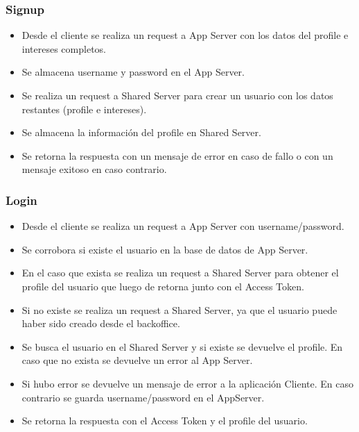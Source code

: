 \documentclass[letterpaper,10pt,english]{sphinxmanual}
\begin{document}
\subsubsection{Signup}
\label{manuals:signup}\begin{itemize}
\item {} 
Desde el cliente se realiza un request a App Server con los datos del profile e intereses completos.

\item {} 
Se almacena username y password en el App Server.

\item {} 
Se realiza un request a Shared Server para crear un usuario con los datos restantes (profile e intereses).

\item {} 
Se almacena la información del profile en Shared Server.

\item {} 
Se retorna la respuesta con un mensaje de error en caso de fallo o con un mensaje exitoso en caso contrario.

\end{itemize}


\subsubsection{Login}
\label{manuals:login}\begin{itemize}
\item {} 
Desde el cliente se realiza un request a App Server con username/password.

\item {} 
Se corrobora si existe el usuario en la base de datos de App Server.

\item {} 
En el caso que exista se realiza un request a Shared Server para obtener el profile del usuario que luego de retorna junto con el Access Token.

\item {} 
Si no existe se realiza un request a Shared Server, ya que el usuario puede haber sido creado desde el backoffice.

\item {} 
Se busca el usuario en el Shared Server y si existe se devuelve el profile. En caso que no exista se devuelve un error al App Server.

\item {} 
Si hubo error se devuelve un mensaje de error a la aplicación Cliente. En caso contrario se guarda username/password en el AppServer.

\item {} 
Se retorna la respuesta con el Access Token y el profile del usuario.

\end{itemize}
\end{document}
